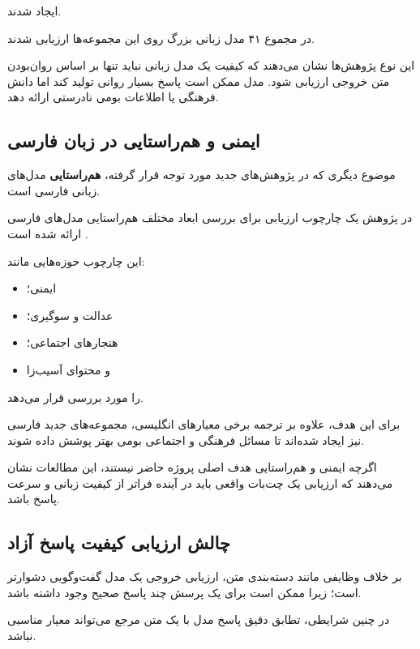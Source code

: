 ایجاد شدند.

در مجموع ۴۱ مدل زبانی بزرگ روی این مجموعه‌ها ارزیابی شدند.

این نوع پژوهش‌ها نشان می‌دهند که کیفیت یک مدل زبانی نباید
تنها بر اساس روان‌بودن متن خروجی ارزیابی شود.
مدل ممکن است پاسخ بسیار روانی تولید کند اما دانش فرهنگی یا
اطلاعات بومی نادرستی ارائه دهد.


\subsection{ایمنی و هم‌راستایی در زبان فارسی}

موضوع دیگری که در پژوهش‌های جدید مورد توجه قرار گرفته،
\textbf{هم‌راستایی}
مدل‌های زبانی فارسی است.

در پژوهش
یک چارچوب ارزیابی برای بررسی ابعاد مختلف هم‌راستایی مدل‌های
فارسی ارائه شده است
\cite{pourbahman2025elab}.

این چارچوب حوزه‌هایی مانند:

\begin{itemize}

    \item ایمنی؛
    \item عدالت و سوگیری؛
    \item هنجارهای اجتماعی؛
    \item و محتوای آسیب‌زا
\end{itemize}

را مورد بررسی قرار می‌دهد.

برای این هدف، علاوه بر ترجمه برخی معیارهای انگلیسی، مجموعه‌های
جدید فارسی نیز ایجاد شده‌اند تا مسائل فرهنگی و اجتماعی بومی
بهتر پوشش داده شوند.

اگرچه ایمنی و هم‌راستایی هدف اصلی پروژه حاضر نیستند،
این مطالعات نشان می‌دهند که ارزیابی یک چت‌بات واقعی باید
در آینده فراتر از کیفیت زبانی و سرعت پاسخ باشد.


\subsection{چالش ارزیابی کیفیت پاسخ آزاد}

بر خلاف وظایفی مانند دسته‌بندی متن، ارزیابی خروجی یک مدل
گفت‌وگویی دشوارتر است؛ زیرا ممکن است برای یک پرسش چند پاسخ
صحیح وجود داشته باشد.

در چنین شرایطی، تطابق دقیق پاسخ مدل با یک متن مرجع می‌تواند
معیار مناسبی نباشد.

